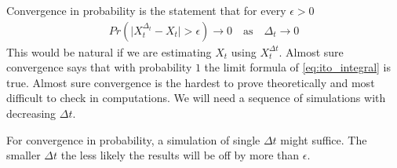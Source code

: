 Convergence in probability is the statement that for every $\epsilon > 0$
\begin{align*}
Pr\left(\big|X_t^{\Delta_t} - X_t\big| > \epsilon\right) \rightarrow 0 \quad \text{as} \quad \Delta_t \rightarrow 0
\end{align*}
This would be natural if we are estimating $X_t$ using $X_t^{\Delta t}$. Almost sure convergence says that with probability $1$ the limit formula of \eqref{eq:ito_integral} is true. Almost sure convergence is the hardest to prove theoretically and most difficult to check in computations. We will need a sequence of simulations with decreasing $\Delta t$. 

For convergence in probability, a simulation of single $\Delta t$ might suffice. The smaller $\Delta t$ the less likely the results will be off by more than $\epsilon$. 

